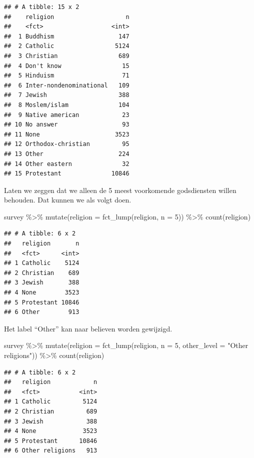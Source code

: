 \documentclass[]{tufte-book}
\newenvironment{Shaded}{}{}
\newcommand{\AttributeTok}[1]{\textcolor[rgb]{0.49,0.56,0.16}{#1}}
\newcommand{\DecValTok}[1]{\textcolor[rgb]{0.25,0.63,0.44}{#1}}
\newcommand{\FunctionTok}[1]{\textcolor[rgb]{0.02,0.16,0.49}{#1}}
\newcommand{\NormalTok}[1]{#1}
\newcommand{\SpecialCharTok}[1]{\textcolor[rgb]{0.25,0.44,0.63}{#1}}
\newcommand{\StringTok}[1]{\textcolor[rgb]{0.25,0.44,0.63}{#1}}
\begin{document}
\begin{verbatim}
## # A tibble: 15 x 2
##    religion                    n
##    <fct>                   <int>
##  1 Buddhism                  147
##  2 Catholic                 5124
##  3 Christian                 689
##  4 Don't know                 15
##  5 Hinduism                   71
##  6 Inter-nondenominational   109
##  7 Jewish                    388
##  8 Moslem/islam              104
##  9 Native american            23
## 10 No answer                  93
## 11 None                     3523
## 12 Orthodox-christian         95
## 13 Other                     224
## 14 Other eastern              32
## 15 Protestant              10846
\end{verbatim}

Laten we zeggen dat we alleen de 5 meest voorkomende godsdiensten willen behouden. Dat kunnen we als volgt doen.

\begin{Shaded}
\begin{Highlighting}[]
\NormalTok{survey }\SpecialCharTok{\%\textgreater{}\%}
  \FunctionTok{mutate}\NormalTok{(}\AttributeTok{religion =} \FunctionTok{fct\_lump}\NormalTok{(religion, }\AttributeTok{n =} \DecValTok{5}\NormalTok{)) }\SpecialCharTok{\%\textgreater{}\%}
  \FunctionTok{count}\NormalTok{(religion)}
\end{Highlighting}
\end{Shaded}

\begin{verbatim}
## # A tibble: 6 x 2
##   religion       n
##   <fct>      <int>
## 1 Catholic    5124
## 2 Christian    689
## 3 Jewish       388
## 4 None        3523
## 5 Protestant 10846
## 6 Other        913
\end{verbatim}

Het label ``Other'' kan naar believen worden gewijzigd.

\begin{Shaded}
\begin{Highlighting}[]
\NormalTok{survey }\SpecialCharTok{\%\textgreater{}\%}
  \FunctionTok{mutate}\NormalTok{(}\AttributeTok{religion =} \FunctionTok{fct\_lump}\NormalTok{(religion, }\AttributeTok{n =} \DecValTok{5}\NormalTok{, }\AttributeTok{other\_level =} \StringTok{"Other religions"}\NormalTok{)) }\SpecialCharTok{\%\textgreater{}\%}
  \FunctionTok{count}\NormalTok{(religion)}
\end{Highlighting}
\end{Shaded}

\begin{verbatim}
## # A tibble: 6 x 2
##   religion            n
##   <fct>           <int>
## 1 Catholic         5124
## 2 Christian         689
## 3 Jewish            388
## 4 None             3523
## 5 Protestant      10846
## 6 Other religions   913
\end{verbatim}
\end{document}
